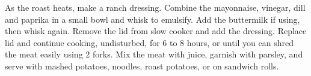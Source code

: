 \begin{recipe}
	As the roast heats, make a ranch dressing. Combine the mayonnaise, vinegar, dill and paprika in a small bowl and whisk to emulsify. Add the buttermilk if using, then whisk again. Remove the lid from slow cooker and add the dressing. Replace lid and continue cooking, undisturbed, for 6 to 8 hours, or until you can shred the meat easily using 2 forks. Mix the meat with juice, garnish with parsley, and serve with mashed potatoes, noodles, roast potatoes, or on sandwich rolls.
	
	
\end{recipe}
